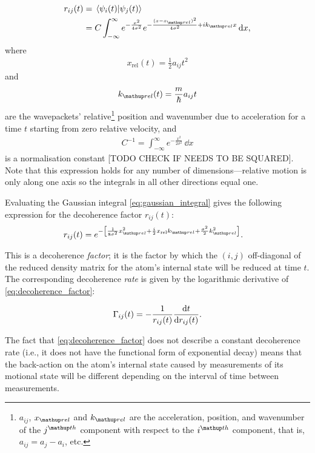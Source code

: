\begin{align}
r_{ij}(t) &= \braket{\psi_i(t)}{\psi_j(t)}\\
 &= C \int_{-\infty}^{\infty} e^{-\frac{x^2}{4\sigma^2}}e^{-\frac{(x-x_\up{rel})^2}{4\sigma^2} + ik_\up{rel}x}\,\dd x,\label{eq:gaussian_integral}
\end{align}
where
\begin{align}
x_{\mathrm{rel}}(t) = \frac12a_{ij}t^2
\end{align}
and
\begin{align}
k_\up{rel}(t) = \frac m \hbar a_{ij} t
\end{align}
are the wavepackets' relative\footnote{$a_{ij}$, $x_\up{rel}$ and $k_\up{rel}$ are the acceleration, position, and wavenumber of the $j^\up{th}$ component with respect to the $i^\up{th}$ component, that is, $a_{ij} = a_j - a_i$, etc.} position and wavenumber due to acceleration for a time $t$ starting from zero relative velocity, and
\begin{align}
C^{-1}=\int_{-\infty}^\infty e^{-\frac{x^2}{2\sigma^2}}\,\dd x\label{supp:eq:Cdef}
\end{align}
is a normalisation constant [TODO CHECK IF NEEDS TO BE SQUARED]. Note that this expression holds for any number of dimensions---relative motion is only along one axis so the integrals in all other directions equal one.

Evaluating the Gaussian integral \eqref{eq:gaussian_integral} gives the following expression for the decoherence factor $r_{ij}(t)$:
\begin{align}
r_{ij}(t)&= e^{-\left[
        \frac{1} {8\sigma^2} x_\up{rel}^2
      + \frac i2 x_{\mathrm{rel}} k_\up{rel}
      + \frac{\sigma^2}{2} k_\up{rel}^2
      \right]}\label{eq:decoherence_factor}.
\end{align}

This is a decoherence \emph{factor}; it is the factor by which the $(i, j)$ off-diagonal of the reduced density matrix for the atom's internal state will be reduced at time $t$. The corresponding decoherence \emph{rate} is given by the logarithmic derivative of \eqref{eq:decoherence_factor}:

\begin{align}
\Gamma_{ij}(t) = - \frac 1 {r_{ij}(t)} \dv t {r_{ij}(t)}.
\end{align}

 The fact that \eqref{eq:decoherence_factor} does not describe a constant decoherence rate (i.e., it does not have the functional form of exponential decay) means that the back-action on the atom's internal state caused by measurements of its motional state will be different depending on the interval of time between measurements.

